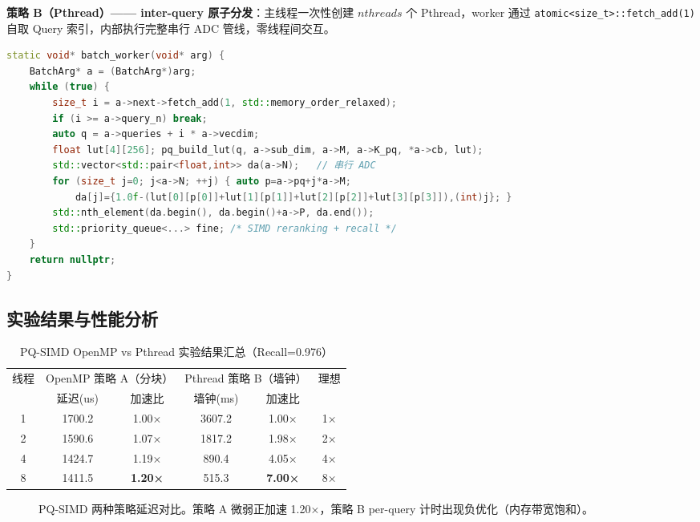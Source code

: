 \documentclass[UTF8,a4paper,10pt]{ctexart}
\begin{document}
\textbf{策略 B（Pthread）—— inter-query 原子分发}：主线程一次性创建 $nthreads$ 个 Pthread，worker 通过 \texttt{atomic<size\_t>::fetch\_add(1)} 自取 Query 索引，内部执行完整串行 ADC 管线，零线程间交互。

\begin{lstlisting}[language=C++, caption={Pthread 策略 B：atomic fetch\_add 零互斥分发 (pq\_pthread.h)}]
static void* batch_worker(void* arg) {
    BatchArg* a = (BatchArg*)arg;
    while (true) {
        size_t i = a->next->fetch_add(1, std::memory_order_relaxed);
        if (i >= a->query_n) break;
        auto q = a->queries + i * a->vecdim;
        float lut[4][256]; pq_build_lut(q, a->sub_dim, a->M, a->K_pq, *a->cb, lut);
        std::vector<std::pair<float,int>> da(a->N);   // 串行 ADC
        for (size_t j=0; j<a->N; ++j) { auto p=a->pq+j*a->M;
            da[j]={1.0f-(lut[0][p[0]]+lut[1][p[1]]+lut[2][p[2]]+lut[3][p[3]]),(int)j}; }
        std::nth_element(da.begin(), da.begin()+a->P, da.end());
        std::priority_queue<...> fine; /* SIMD reranking + recall */
    }
    return nullptr;
}
\end{lstlisting}

\subsection{实验结果与性能分析}

\begin{table}[H]
\centering
\caption{PQ-SIMD OpenMP vs Pthread 实验结果汇总（Recall=0.976）}
\begin{tabular}{cccccc}
\hline
\multirow{2}{*}{线程} & \multicolumn{2}{c}{OpenMP 策略 A（分块）} & \multicolumn{2}{c}{Pthread 策略 B（墙钟）} & 理想 \\
& 延迟(us) & 加速比 & 墙钟(ms) & 加速比 & \\
\hline
1 & 1700.2 & 1.00× & 3607.2 & 1.00× & 1× \\
2 & 1590.6 & 1.07× & 1817.2 & 1.98× & 2× \\
4 & 1424.7 & 1.19× & 890.4  & 4.05× & 4× \\
8 & 1411.5 & \textbf{1.20×} & 515.3  & \textbf{7.00×} & 8× \\
\hline
\end{tabular}
\end{table}

\begin{figure}[H]
\centering
{}
\caption{PQ-SIMD 两种策略延迟对比。策略 A 微弱正加速 1.20×，策略 B per-query 计时出现负优化（内存带宽饱和）。}
\end{figure}
\end{document}
